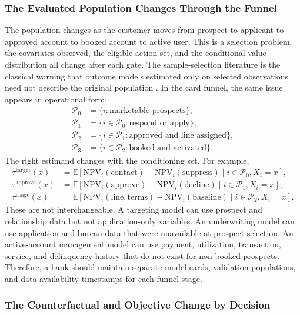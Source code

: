 \documentclass[11pt]{article}
\newcommand{\E}{\mathbb{E}}
\newcommand{\NPV}{\mathrm{NPV}}
\newcommand{\1}{\mathbf{1}}
\begin{document}
\subsubsection{The Evaluated Population Changes Through the Funnel}
\label{subsec:funnel-population}

The population changes as the customer moves from prospect to applicant to
approved account to booked account to active user. This is a selection problem:
the covariates observed, the eligible action set, and the conditional value
distribution all change after each gate. The sample-selection literature is the
classical warning that outcome models estimated only on selected observations
need not describe the original population \citep{heckman1979selection}. In the
card funnel, the same issue appears in operational form:
\begin{align}
  \mathcal{P}_0 &= \{i:\text{marketable prospects}\},\\
  \mathcal{P}_1 &= \{i\in\mathcal{P}_0:\text{respond or apply}\},\\
  \mathcal{P}_2 &= \{i\in\mathcal{P}_1:\text{approved and line assigned}\},\\
  \mathcal{P}_3 &= \{i\in\mathcal{P}_2:\text{booked and activated}\}.
  \label{eq:funnel-populations}
\end{align}
The right estimand changes with the conditioning set. For example,
\begin{align}
  \tau^{\mathrm{target}}(x)
    &= \E[\NPV_i(\mathrm{contact})-\NPV_i(\mathrm{suppress})
        \mid i\in\mathcal{P}_0,X_i=x],\\
  \tau^{\mathrm{approve}}(x)
    &= \E[\NPV_i(\mathrm{approve})-\NPV_i(\mathrm{decline})
        \mid i\in\mathcal{P}_1,X_i=x],\\
  \tau^{\mathrm{usage}}(x)
    &= \E[\NPV_i(\mathrm{line},\mathrm{terms})-\NPV_i(\mathrm{baseline})
        \mid i\in\mathcal{P}_2,X_i=x].
  \label{eq:funnel-estimands}
\end{align}
These are not interchangeable. A targeting model can use prospect and
relationship data but not application-only variables. An underwriting model can
use application and bureau data that were unavailable at prospect selection.
An active-account management model can use payment, utilization, transaction,
service, and delinquency history that do not exist for non-booked prospects.
Therefore, a bank should maintain separate model cards, validation populations,
and data-availability timestamps for each funnel stage.

\subsubsection{The Counterfactual and Objective Change by Decision}
\label{subsec:decision-counterfactuals}
\end{document}
